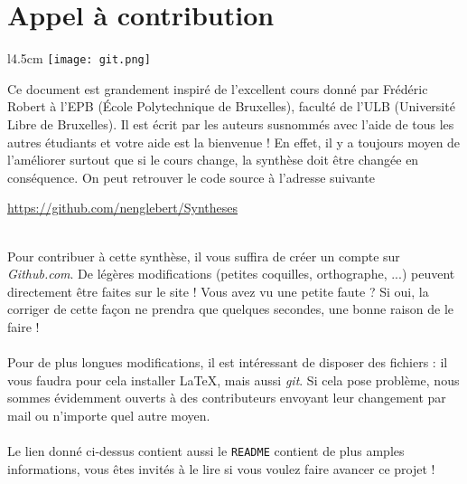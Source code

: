 \chapter*{Appel à contribution}
\begin{wrapfigure}[5]{l}{4.5cm}
	\texttt{[image: git.png]}
\end{wrapfigure}
Ce document est grandement inspiré de l’excellent cours donné 
par Frédéric Robert à l’EPB (École Polytechnique de Bruxelles), faculté de l’ULB (Université 
Libre de Bruxelles). Il est écrit par les auteurs susnommés avec l’aide de tous les autres étudiants 
et votre aide est la bienvenue ! En effet, il y a toujours moyen de l’améliorer surtout que si le 
cours change, la synthèse doit être changée en conséquence. On peut retrouver le code source à l’adresse 
suivante
\begin{center}
	\url{https://github.com/nenglebert/Syntheses}
\end{center}\ \\
Pour contribuer à cette synthèse, il vous suffira de créer un compte sur \textit{Github.com}. De
légères modifications (petites coquilles, orthographe, ...) peuvent directement être faites sur le
site ! Vous avez vu une petite faute ? Si oui, la corriger de cette façon ne prendra que quelques 
secondes, une bonne raison de le faire ! \\
\\
Pour de plus longues modifications, il est intéressant de disposer des fichiers : il vous 
faudra pour cela installer \LaTeX, mais aussi \textit{git}. Si cela pose problème, nous sommes 
évidemment ouverts à des contributeurs envoyant leur changement par mail ou n’importe quel autre 
moyen.\\
\\
Le lien donné ci-dessus contient aussi le \texttt{README} contient de plus amples informations, 
vous êtes invités à le lire si vous voulez faire avancer ce projet ! 

